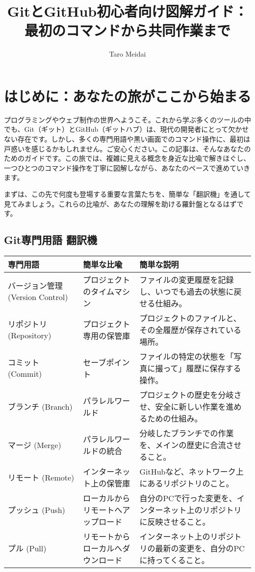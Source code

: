 \documentclass{ltjsarticle}
\begin{document}
\title{GitとGitHub初心者向け図解ガイド：\\最初のコマンドから共同作業まで}
\author{Taro Meidai}
\maketitle
\tableofcontents
\newpage

\section*{はじめに：あなたの旅がここから始まる}
プログラミングやウェブ制作の世界へようこそ。これから学ぶ多くのツールの中でも、Git（ギット）とGitHub（ギットハブ）は、現代の開発者にとって欠かせない存在です。しかし、多くの専門用語や黒い画面でのコマンド操作に、最初は戸惑いを感じるかもしれません。ご安心ください。この記事は、そんなあなたのためのガイドです。この旅では、複雑に見える概念を身近な比喩で解きほぐし、一つひとつのコマンド操作を丁寧に図解しながら、あなたのペースで進めていきます。

まずは、この先で何度も登場する重要な言葉たちを、簡単な「翻訳機」を通して見てみましょう。これらの比喩が、あなたの理解を助ける羅針盤となるはずです。

\subsection*{Git専門用語 翻訳機}
\begin{tabular}{|l|l|p{6cm}|}
\hline
\textbf{専門用語} & \textbf{簡単な比喩} & \textbf{簡単な説明} \\
\hline
バージョン管理 (Version Control) & プロジェクトのタイムマシン & ファイルの変更履歴を記録し、いつでも過去の状態に戻せる仕組み。 \\
リポジトリ (Repository) & プロジェクト専用の保管庫 & プロジェクトのファイルと、その全履歴が保存されている場所。 \\
コミット (Commit) & セーブポイント & ファイルの特定の状態を「写真に撮って」履歴に保存する操作。 \\
ブランチ (Branch) & パラレルワールド & プロジェクトの歴史を分岐させ、安全に新しい作業を進めるための仕組み。 \\
マージ (Merge) & パラレルワールドの統合 & 分岐したブランチでの作業を、メインの歴史に合流させること。 \\
リモート (Remote) & インターネット上の保管庫 & GitHubなど、ネットワーク上にあるリポジトリのこと。 \\
プッシュ (Push) & ローカルからリモートへアップロード & 自分のPCで行った変更を、インターネット上のリポジトリに反映させること。 \\
プル (Pull) & リモートからローカルへダウンロード & インターネット上のリポジトリの最新の変更を、自分のPCに持ってくること。 \\
\hline
\end{tabular}
\end{document}
